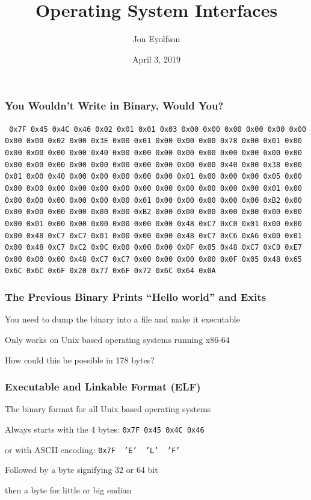 \documentclass[aspectratio=169]{beamer}
\title{Operating System Interfaces}
\date{April 3, 2019}
\author{Jon Eyolfson}
\begin{document}
  \begin{frame}[plain]
    \titlepage
  \end{frame}

  \setcounter{framenumber}{0}

  \begin{frame}
    \frametitle{You Wouldn't Write in Binary, Would You?}

    \texttt{%
      0x7F 0x45 0x4C 0x46 0x02 0x01 0x01 0x03 0x00 0x00 0x00 0x00 0x00 0x00 0x00
      0x00 0x02 0x00 0x3E 0x00 0x01 0x00 0x00 0x00 0x78 0x00 0x01 0x00 0x00 0x00
      0x00 0x00 0x40 0x00 0x00 0x00 0x00 0x00 0x00 0x00 0x00 0x00 0x00 0x00 0x00
      0x00 0x00 0x00 0x00 0x00 0x00 0x00 0x40 0x00 0x38 0x00 0x01 0x00 0x40 0x00
      0x00 0x00 0x00 0x00 0x01 0x00 0x00 0x00 0x05 0x00 0x00 0x00 0x00 0x00 0x00
      0x00 0x00 0x00 0x00 0x00 0x00 0x00 0x01 0x00 0x00 0x00 0x00 0x00 0x00 0x00
      0x01 0x00 0x00 0x00 0x00 0x00 0xB2 0x00 0x00 0x00 0x00 0x00 0x00 0x00 0xB2
      0x00 0x00 0x00 0x00 0x00 0x00 0x00 0x00 0x01 0x00 0x00 0x00 0x00 0x00 0x00
      0x48 0xC7 0xC0 0x01 0x00 0x00 0x00 0x48 0xC7 0xC7 0x01 0x00 0x00 0x00 0x48
      0xC7 0xC6 0xA6 0x00 0x01 0x00 0x48 0xC7 0xC2 0x0C 0x00 0x00 0x00 0x0F 0x05
      0x48 0xC7 0xC0 0xE7 0x00 0x00 0x00 0x48 0xC7 0xC7 0x00 0x00 0x00 0x00 0x0F
      0x05 0x48 0x65 0x6C 0x6C 0x6F 0x20 0x77 0x6F 0x72 0x6C 0x64 0x0A
    }
  \end{frame}

  \begin{frame}
    \frametitle{The Previous Binary Prints ``Hello world'' and Exits}

    You need to dump the binary into a file and make it executable

    \hspace{1em} Only works on Unix based operating systems running x86-64

    \vspace{2em}

    How could this be possible in 178 bytes?
  \end{frame}

  \begin{frame}
    \frametitle{Executable and Linkable Format (ELF)}

    The binary format for all Unix based operating systems

    \vspace{2em}

    Always starts with the 4 bytes: \hspace{0.5em} \texttt{0x7F 0x45 0x4C 0x46}

    \hspace{3em} or with ASCII encoding: \hspace{0.5em}
    \texttt{0x7F~~'E'~~'L'~~'F'}

    \vspace{2em}

    Followed by a byte signifying 32 or 64 bit

    \hspace{1em} then a byte for little or big endian
  \end{frame}
\end{document}
